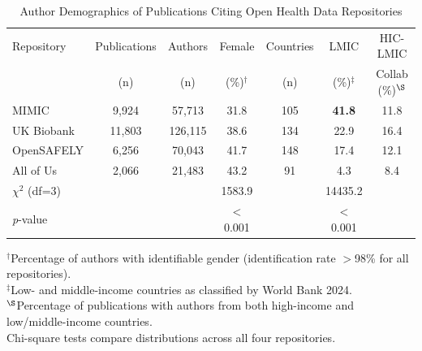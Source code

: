 

\begin{table}[htbp]
\centering
\caption{Author Demographics of Publications Citing Open Health Data Repositories}
\label{tab:demographics}
\begin{tabular}{lcccccc}
\toprule
Repository & Publications & Authors & Female & Countries & LMIC & HIC-LMIC \\
           & (n)          & (n)     & (\%)$^\dagger$ & (n) & (\%)$^\ddagger$ & Collab (\%)$^\S$ \\
\midrule
MIMIC      & 9,924  & 57,713  & 31.8 & 105 & \textbf{41.8} & 11.8 \\
UK Biobank & 11,803 & 126,115 & 38.6 & 134 & 22.9 & 16.4 \\
OpenSAFELY & 6,256  & 70,043  & 41.7 & 148 & 17.4 & 12.1 \\
All of Us  & 2,066  & 21,483  & 43.2 & 91  & 4.3  & 8.4 \\
\midrule
$\chi^2$ (df=3) & & & 1583.9 & & 14435.2 & \\
\textit{p}-value & & & $<$0.001 & & $<$0.001 & \\
\bottomrule
\end{tabular}

\smallskip
\footnotesize
$^\dagger$Percentage of authors with identifiable gender (identification rate $>$98\% for all repositories). \\
$^\ddagger$Low- and middle-income countries as classified by World Bank 2024. \\
$^\S$Percentage of publications with authors from both high-income and low/middle-income countries. \\
Chi-square tests compare distributions across all four repositories.
\end{table}



